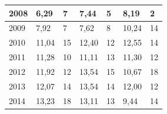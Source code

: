 \begin{table}[H]
\begin{tabular}{|l|l|l|l|l|l|l|}
		2008          & 6,29                                                   & 7                                                       & 7,44                                                      & 5                                                          & 8,19                                                        & 2                                                           \\ \hline
		2009          & 7,92                                                   & 7                                                       & 7,62                                                      & 8                                                         & 10,24                                                       & 14                                                          \\ \hline
		2010          & 11,04                                                  & 15                                                      & 12,40                                                     & 12                                                         & 12,55                                                       & 14                                                          \\ \hline
		2011          & 11,28                                                  & 10                                                      & 11,11                                                     & 13                                                         & 11,30                                                       & 12                                                          \\ \hline
		2012          & 11,92                                                  & 12                                                      & 13,54                                                     & 15                                                         & 10,67                                                       & 18                                                          \\ \hline
		2013          & 12,07                                                  & 14                                                      & 13,54                                                     & 14                                                         & 12,00                                                       & 12                                                          \\ \hline
		2014          & 13,23                                                  & 18                                                      & 13,11                                                     & 13                                                         & 9,44                                                        & 14                                                          \\ \hline

\end{tabular}
\end{table}
